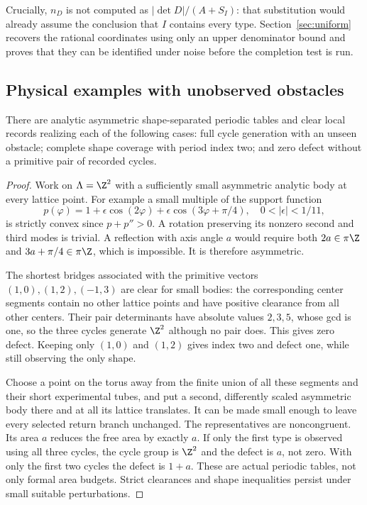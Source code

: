 Crucially, $n_D$ is not computed as $|\det D|/(A+S_I)$: that substitution
would already assume the conclusion that $I$ contains every type.
Section~\ref{sec:uniform} recovers the rational coordinates using only
an upper denominator bound and proves that they can be identified under
noise before the completion test is run.

\subsection{Physical examples with unobserved obstacles}
\begin{proposition}\label{prop:examples}
There are analytic asymmetric shape-separated periodic tables and clear
local records realizing each of the following cases: full cycle generation
with an unseen obstacle; complete shape coverage with period index two;
and zero defect without a primitive pair of recorded cycles.
\end{proposition}
\begin{proof}
Work on $\Lambda=\Z^2$ with a sufficiently small asymmetric analytic
body at every lattice point. For example a small multiple of the support
function
\[
 p(\varphi)=1+\epsilon\cos(2\varphi)
                   +\epsilon\cos(3\varphi+\pi/4),\quad
                         0<|\epsilon|<1/11,
\]
is strictly convex since $p+p''>0$. A rotation preserving its nonzero
second and third modes is trivial. A reflection with axis angle $a$
would require both $2a\in\pi\Z$ and $3a+\pi/4\in\pi\Z$, which
is impossible. It is therefore asymmetric.

The shortest bridges associated with the primitive vectors
$(1,0),(1,2),(-1,3)$ are clear for small bodies: the corresponding
center segments contain no other lattice points and have positive
clearance from all other centers. Their pair determinants have absolute
values $2,3,5$, whose gcd is one, so the three cycles generate $\Z^2$
although no pair does. This gives zero defect. Keeping only $(1,0)$
and $(1,2)$ gives index two and defect one, while still observing the
only shape.

Choose a point on the torus away from the finite union of all these
segments and their short experimental tubes, and put a second, differently
scaled asymmetric body there and at all its lattice translates. It can
be made small enough to leave every selected return branch unchanged.
The representatives are noncongruent. Its area $a$ reduces the free area
by exactly $a$. If only the first type is observed using all three
cycles, the cycle group is $\Z^2$ and the defect is $a$, not zero.
With only the first two cycles the defect is $1+a$. These are actual
periodic tables, not only formal area budgets. Strict clearances and
shape inequalities persist under small suitable perturbations.
\end{proof}
